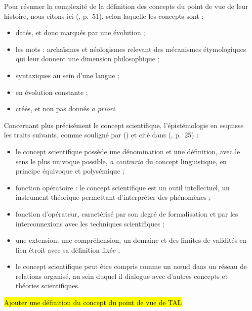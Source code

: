 Pour résumer la complexité de la définition des concepts du point de vue de leur histoire, nous citons ici \citeauthor{bal2002travelling} (\citeyear{bal2002travelling}, p.~51), selon laquelle les concepts sont :
\begin{itemize}
	\item datés, et donc marqués par une évolution ;
	\item les mots : archaïsmes et néologismes relevant des mécanismes étymologiques qui leur donnent une dimension philosophique ;
	\item syntaxiques au sein d'une langue ;
	\item en évolution constante ;
	\item créés, et non pas donnés \textit{a priori}.
\end{itemize}
\medskip
Concernant plus précisément le concept scientifique, l'épistémologie en esquisse les traits suivants, comme souligné par \citeauthor{rumelhard1986} (\citeyear{rumelhard1986}) et cité dans \citeauthor{astolfi2008chapitre} (\citeyear{astolfi2008chapitre}, p.~25) :
\begin{itemize}
	\item le concept scientifique possède une dénomination et une définition, avec le sens le plus univoque possible, \textit{a contrario} du concept linguistique, en principe équivoque et polysémique ;
	\item fonction opératoire : le concept scientifique est un outil intellectuel, un instrument théorique permettant d'interpréter des phénomènes ;
	\item fonction d'opérateur, caractérisé par son degré de formalisation et par les interconnexions avec les techniques scientifiques ;
	\item une extension, une compréhension, un domaine et des limites de validités en lien étroit avec sa définition fixée ;
	\item le concept scientifique peut être compris comme un n\oe{}ud dans un réseau de relations organisé, au sein duquel il dialogue avec d'autres concepts et théories scientifiques.
\end{itemize}

\hl{Ajouter une définition du concept du point de vue de TAL}

